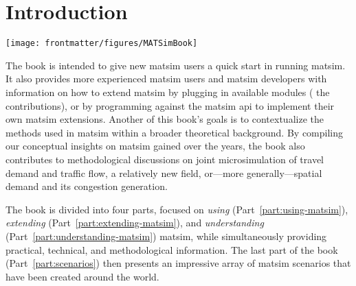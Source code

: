 \chapter*{Introduction}
%

\begin{center} \texttt{[image: frontmatter/figures/MATSimBook]} \end{center}

%
%
The book is intended to give new \gls{matsim} users a quick start in running \gls{matsim}. It also provides more experienced \gls{matsim} users and \gls{matsim} developers with 
information on how to extend \gls{matsim} by plugging in available modules (\eg 
the \glspl{contribution}),  or by programming against the \gls{matsim} \gls{api} to implement their own \gls{matsim} \glspl{extension}. Another of this book's 
goals is to 
contextualize %
the methods used in \gls{matsim} within a broader theoretical background. By compiling our conceptual insights on \gls{matsim} gained over the years, the book also contributes to methodological discussions on joint \gls{microsimulation} of travel demand and traffic flow, a relatively new field, or---more generally---spatial demand and its congestion generation.

The book is divided into four parts, focused on \emph{using} (Part~\ref{part:using-matsim}), \emph{extending} (Part~\ref{part:extending-matsim}), and \emph{understanding} (Part~\ref{part:understanding-matsim}) \gls{matsim}, 
while simultaneously providing practical, technical, and methodological information. The last part of the book (Part~\ref{part:scenarios}) then presents an impressive array of  \gls{matsim} scenarios that have 
been created around the world. %


